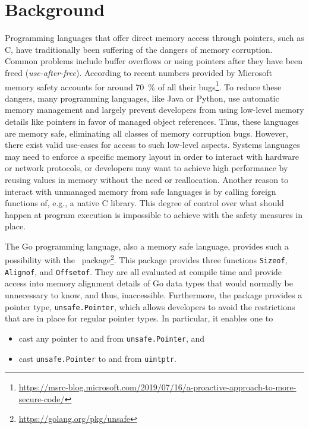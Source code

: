 \section{Background}
\label{sec:background}

Programming languages that offer direct memory access through pointers, such as C, have traditionally been suffering of the dangers of memory corruption.
Common problems include buffer overflows \cite{alnaeli2017, larochelle2001} or using pointers after they have been freed (\textit{use-after-free}).
According to recent numbers provided by Microsoft memory safety accounts for around 70~\% of all their bugs\footnote{\url{https://msrc-blog.microsoft.com/2019/07/16/a-proactive-approach-to-more-secure-code/}}. 
To reduce these dangers, many programming languages, like Java or Python, use automatic memory management and largely prevent developers from using low-level memory details like pointers in favor of managed object references.
Thus, these languages are memory safe, eliminating all classes of memory corruption bugs. 
However, there exist valid use-cases for access to such low-level aspects.
Systems languages may need to enforce a specific memory layout in order to interact with hardware or network protocols, or developers may want to achieve high performance by reusing values in memory without the need or reallocation. 
Another reason to interact with unmanaged memory from safe languages is by calling foreign functions of, e.g., a native C library.
This degree of control over what should happen at program execution is impossible to achieve with the safety measures in place.

The Go programming language, also a memory safe language, provides such a possibility with the \unsafe{}~package\footnote{\url{https://golang.org/pkg/unsafe}}. 
This package provides three functions \texttt{Sizeof}, \texttt{Alignof}, and \texttt{Offsetof}. 
They are all evaluated at compile time and provide access into memory alignment details of Go data types that would normally be unnecessary to know, and thus, inaccessible.
Furthermore, the package provides a pointer type, \texttt{unsafe.Pointer}, which allows developers to avoid the restrictions that are in place for regular pointer types.
In particular, it enables one to 

\begin{itemize}
    \item cast any pointer to and from \texttt{unsafe.Pointer}, and
    \item cast \texttt{unsafe.Pointer} to and from \texttt{uintptr}.
\end{itemize}

